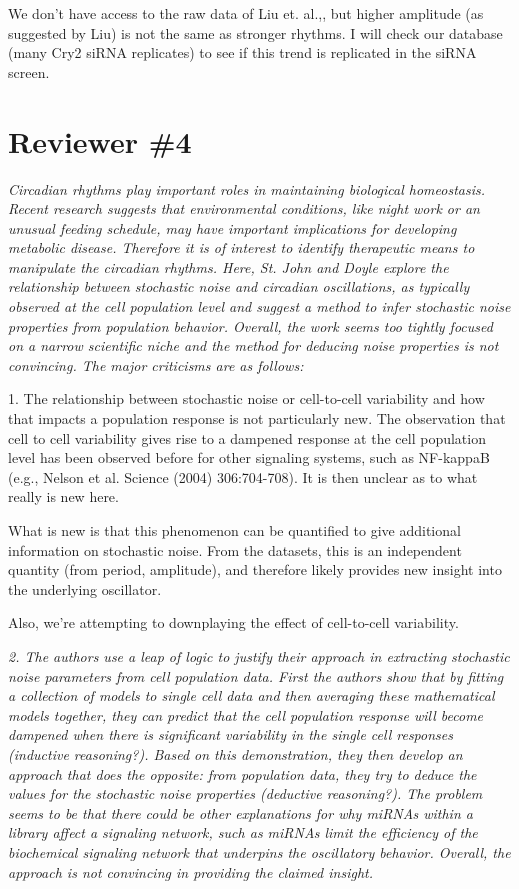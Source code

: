 \documentclass[11pt, letterpaper]{article}
\newenvironment{reviewer}{\itshape\color{gray}}{}
\begin{document}
We don't have access to the raw data of Liu et. al.,, but higher amplitude (as suggested by Liu) is not the same as stronger rhythms. I will check our database (many Cry2 siRNA replicates) to see if this trend is replicated in the siRNA screen.


\section*{Reviewer \#4}

\begin{reviewer}
Circadian rhythms play important roles in maintaining biological homeostasis. Recent research suggests that environmental conditions, like night work or an unusual feeding schedule, may have important implications for developing metabolic disease. Therefore it is of interest to identify therapeutic means to manipulate the circadian rhythms. Here, St. John and Doyle explore the relationship between stochastic noise and circadian oscillations, as typically observed at the cell population level and suggest a method to infer stochastic noise properties from population behavior. Overall, the work seems too tightly focused on a narrow scientific niche and the method for deducing noise properties is not convincing. The major criticisms are as follows:

1. The relationship between stochastic noise or cell-to-cell variability and how that impacts a population response is not particularly new. The observation that cell to cell variability gives rise to a dampened response at the cell population level has been observed before for other signaling systems, such as NF-kappaB (e.g., Nelson et al. Science (2004) 306:704-708). It is then unclear as to what really is new here.
\end{reviewer}

What is new is that this phenomenon can be quantified to give additional information on stochastic noise. From the datasets, this is an independent quantity (from period, amplitude), and therefore likely provides new insight into the underlying oscillator.

Also, we're attempting to downplaying the effect of cell-to-cell variability.

\begin{reviewer}
2. The authors use a leap of logic to justify their approach in extracting stochastic noise parameters from cell population data. First the authors show that by fitting a collection of models to single cell data and then averaging these mathematical models together, they can predict that the cell population response will become dampened when there is significant variability in the single cell responses (inductive reasoning?). Based on this demonstration, they then develop an approach that does the opposite: from population data, they try to deduce the values for the stochastic noise properties (deductive reasoning?). The problem seems to be that there could be other explanations for why miRNAs within a library affect a signaling network, such as miRNAs limit the efficiency of the biochemical signaling network that underpins the oscillatory behavior. Overall, the approach is not convincing in providing the claimed insight. 
\end{reviewer}
\end{document}
